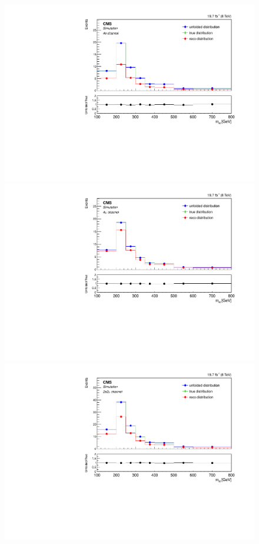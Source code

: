 \begin{figure}[hbtp]
\begin{center}
    \includegraphics[width=0.8\cmsFigWidth]{Figures/Unfolding/MCTests/Mass_ZZTo4e_MadMatrix_MadDistr_HalfSample_fr}     
    \includegraphics[width=0.8\cmsFigWidth]{Figures/Unfolding/MCTests/Mass_ZZTo4m_MadMatrix_MadDistr_HalfSample_fr}     
    \includegraphics[width=0.8\cmsFigWidth]{Figures/Unfolding/MCTests/Mass_ZZTo2e2m_MadMatrix_MadDistr_HalfSample_fr}     

\end{center}
\end{figure}
